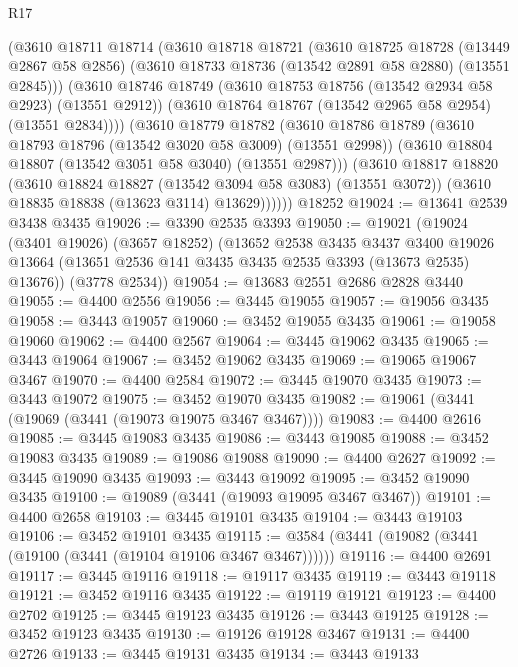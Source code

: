 \begin{lexlean}{R17}
\begin{coremodule}
        (@3610
          @18711
          @18714
          (@3610
            @18718
            @18721
            (@3610
              @18725
              @18728
              (@13449 @2867 @58 @2856)
              (@3610 @18733 @18736 (@13542 @2891 @58 @2880) (@13551 @2845)))
            (@3610
              @18746
              @18749
              (@3610 @18753 @18756 (@13542 @2934 @58 @2923) (@13551 @2912))
              (@3610 @18764 @18767 (@13542 @2965 @58 @2954) (@13551 @2834))))
          (@3610
            @18779
            @18782
            (@3610
              @18786
              @18789
              (@3610 @18793 @18796 (@13542 @3020 @58 @3009) (@13551 @2998))
              (@3610 @18804 @18807 (@13542 @3051 @58 @3040) (@13551 @2987)))
            (@3610
              @18817
              @18820
              (@3610 @18824 @18827 (@13542 @3094 @58 @3083) (@13551 @3072))
              (@3610 @18835 @18838 (@13623 @3114) @13629))))))
    @18252
@19024 := @13641 @2539 @3438 @3435
@19026 := @3390 @2535 @3393
@19050 := @19021
    (@19024
      (@3401 @19026)
      (@3657 @18252)
      (@13652
        @2538
        @3435
        @3437
        @3400
        @19026
        @13664
        (@13651 @2536 @141 @3435 @3435 @2535 @3393 (@13673 @2535) @13676))
      (@3778 @2534))
@19054 := @13683 @2551 @2686 @2828 @3440
@19055 := @4400 @2556
@19056 := @3445 @19055
@19057 := @19056 @3435
@19058 := @3443 @19057
@19060 := @3452 @19055 @3435
@19061 := @19058 @19060
@19062 := @4400 @2567
@19064 := @3445 @19062 @3435
@19065 := @3443 @19064
@19067 := @3452 @19062 @3435
@19069 := @19065 @19067 @3467
@19070 := @4400 @2584
@19072 := @3445 @19070 @3435
@19073 := @3443 @19072
@19075 := @3452 @19070 @3435
@19082 := @19061 (@3441 (@19069 (@3441 (@19073 @19075 @3467 @3467))))
@19083 := @4400 @2616
@19085 := @3445 @19083 @3435
@19086 := @3443 @19085
@19088 := @3452 @19083 @3435
@19089 := @19086 @19088
@19090 := @4400 @2627
@19092 := @3445 @19090 @3435
@19093 := @3443 @19092
@19095 := @3452 @19090 @3435
@19100 := @19089 (@3441 (@19093 @19095 @3467 @3467))
@19101 := @4400 @2658
@19103 := @3445 @19101 @3435
@19104 := @3443 @19103
@19106 := @3452 @19101 @3435
@19115 := @3584 (@3441 (@19082 (@3441 (@19100 (@3441 (@19104 @19106 @3467 @3467))))))
@19116 := @4400 @2691
@19117 := @3445 @19116
@19118 := @19117 @3435
@19119 := @3443 @19118
@19121 := @3452 @19116 @3435
@19122 := @19119 @19121
@19123 := @4400 @2702
@19125 := @3445 @19123 @3435
@19126 := @3443 @19125
@19128 := @3452 @19123 @3435
@19130 := @19126 @19128 @3467
@19131 := @4400 @2726
@19133 := @3445 @19131 @3435
@19134 := @3443 @19133

\end{coremodule}
\end{lexlean}
